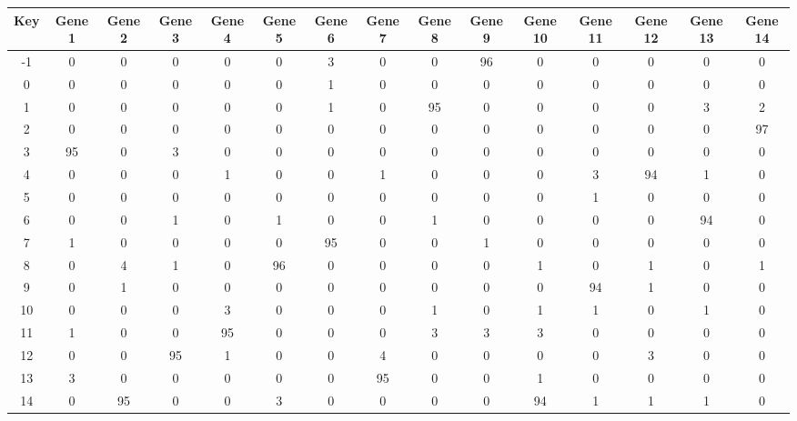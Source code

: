 \begin{tabular}{|c|c|c|c|c|c|c|c|c|c|c|c|c|c|c|}
\hline
Key & Gene 1 & Gene 2 & Gene 3 & Gene 4 & Gene 5 & Gene 6 & Gene 7 & Gene 8 & Gene 9 & Gene 10 & Gene 11 & Gene 12 & Gene 13 & Gene 14 \\
\hline
-1 & 0 & 0 & 0 & 0 & 0 & 3 & 0 & 0 & 96 & 0 & 0 & 0 & 0 & 0 \\
0 & 0 & 0 & 0 & 0 & 0 & 1 & 0 & 0 & 0 & 0 & 0 & 0 & 0 & 0 \\
1 & 0 & 0 & 0 & 0 & 0 & 1 & 0 & 95 & 0 & 0 & 0 & 0 & 3 & 2 \\
2 & 0 & 0 & 0 & 0 & 0 & 0 & 0 & 0 & 0 & 0 & 0 & 0 & 0 & 97 \\
3 & 95 & 0 & 3 & 0 & 0 & 0 & 0 & 0 & 0 & 0 & 0 & 0 & 0 & 0 \\
4 & 0 & 0 & 0 & 1 & 0 & 0 & 1 & 0 & 0 & 0 & 3 & 94 & 1 & 0 \\
5 & 0 & 0 & 0 & 0 & 0 & 0 & 0 & 0 & 0 & 0 & 1 & 0 & 0 & 0 \\
6 & 0 & 0 & 1 & 0 & 1 & 0 & 0 & 1 & 0 & 0 & 0 & 0 & 94 & 0 \\
7 & 1 & 0 & 0 & 0 & 0 & 95 & 0 & 0 & 1 & 0 & 0 & 0 & 0 & 0 \\
8 & 0 & 4 & 1 & 0 & 96 & 0 & 0 & 0 & 0 & 1 & 0 & 1 & 0 & 1 \\
9 & 0 & 1 & 0 & 0 & 0 & 0 & 0 & 0 & 0 & 0 & 94 & 1 & 0 & 0 \\
10 & 0 & 0 & 0 & 3 & 0 & 0 & 0 & 1 & 0 & 1 & 1 & 0 & 1 & 0 \\
11 & 1 & 0 & 0 & 95 & 0 & 0 & 0 & 3 & 3 & 3 & 0 & 0 & 0 & 0 \\
12 & 0 & 0 & 95 & 1 & 0 & 0 & 4 & 0 & 0 & 0 & 0 & 3 & 0 & 0 \\
13 & 3 & 0 & 0 & 0 & 0 & 0 & 95 & 0 & 0 & 1 & 0 & 0 & 0 & 0 \\
14 & 0 & 95 & 0 & 0 & 3 & 0 & 0 & 0 & 0 & 94 & 1 & 1 & 1 & 0 \\
\hline
\end{tabular}